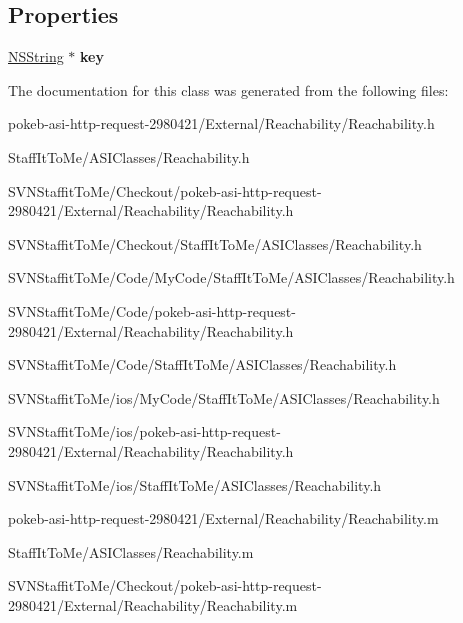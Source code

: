 \subsection*{\-Properties}
\begin{DoxyCompactItemize}
\item 
\hypertarget{interface_reachability_ad422638c85b8b0c04d6c7f2ba4cddc01}{
\hyperlink{class_n_s_string}{\-N\-S\-String} $\ast$ {\bfseries key}}
\label{interface_reachability_ad422638c85b8b0c04d6c7f2ba4cddc01}

\end{DoxyCompactItemize}


\-The documentation for this class was generated from the following files\-:\begin{DoxyCompactItemize}
\item 
pokeb-\/asi-\/http-\/request-\/2980421/\-External/\-Reachability/\-Reachability.\-h\item 
\-Staff\-It\-To\-Me/\-A\-S\-I\-Classes/\-Reachability.\-h\item 
\-S\-V\-N\-Staffit\-To\-Me/\-Checkout/pokeb-\/asi-\/http-\/request-\/2980421/\-External/\-Reachability/\-Reachability.\-h\item 
\-S\-V\-N\-Staffit\-To\-Me/\-Checkout/\-Staff\-It\-To\-Me/\-A\-S\-I\-Classes/\-Reachability.\-h\item 
\-S\-V\-N\-Staffit\-To\-Me/\-Code/\-My\-Code/\-Staff\-It\-To\-Me/\-A\-S\-I\-Classes/\-Reachability.\-h\item 
\-S\-V\-N\-Staffit\-To\-Me/\-Code/pokeb-\/asi-\/http-\/request-\/2980421/\-External/\-Reachability/\-Reachability.\-h\item 
\-S\-V\-N\-Staffit\-To\-Me/\-Code/\-Staff\-It\-To\-Me/\-A\-S\-I\-Classes/\-Reachability.\-h\item 
\-S\-V\-N\-Staffit\-To\-Me/ios/\-My\-Code/\-Staff\-It\-To\-Me/\-A\-S\-I\-Classes/\-Reachability.\-h\item 
\-S\-V\-N\-Staffit\-To\-Me/ios/pokeb-\/asi-\/http-\/request-\/2980421/\-External/\-Reachability/\-Reachability.\-h\item 
\-S\-V\-N\-Staffit\-To\-Me/ios/\-Staff\-It\-To\-Me/\-A\-S\-I\-Classes/\-Reachability.\-h\item 
pokeb-\/asi-\/http-\/request-\/2980421/\-External/\-Reachability/\-Reachability.\-m\item 
\-Staff\-It\-To\-Me/\-A\-S\-I\-Classes/\-Reachability.\-m\item 
\-S\-V\-N\-Staffit\-To\-Me/\-Checkout/pokeb-\/asi-\/http-\/request-\/2980421/\-External/\-Reachability/\-Reachability.\-m\item 

\end{DoxyCompactItemize}
